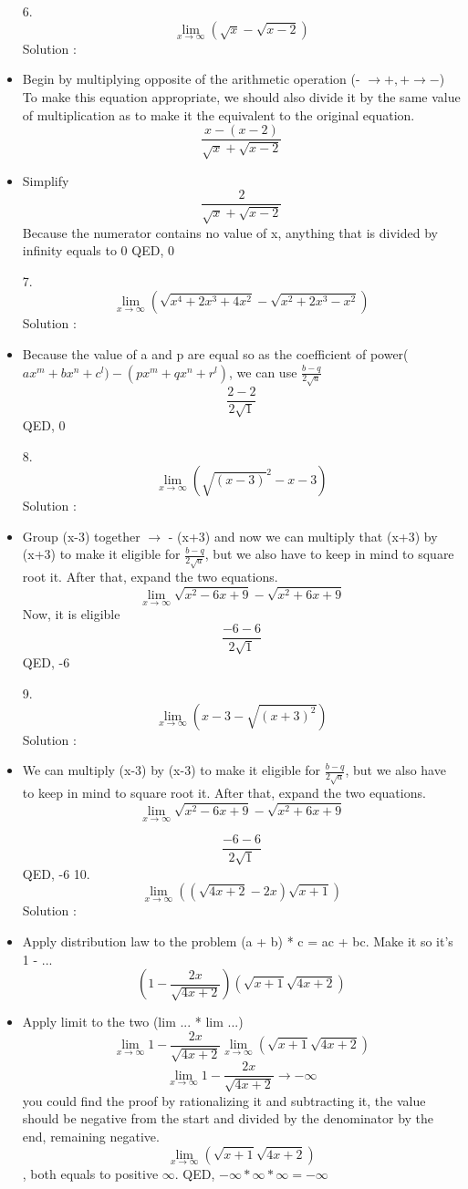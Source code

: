 \documentclass{article}
\begin{document}
\begin{itemize}
6. $$\displaystyle \lim_{x\to\infty}(\sqrt{x}-\sqrt{x-2})$$
Solution : 

\item Begin by multiplying opposite of the arithmetic operation (- $\to +, + \to -$) To make this equation appropriate, we should also divide it by the same value of multiplication as to make it the equivalent to the original equation.
$$\frac{x-(x-2)}{\sqrt{x}+\sqrt{x-2}}$$
\item Simplify 
$$\frac{2}{\sqrt{x}+\sqrt{x-2}}$$
Because the numerator contains no value of x, anything that is divided by infinity equals to 0
QED, 0

7. $$\displaystyle \lim_{x\to\infty}(\sqrt{x^4+2x^3+4x^2}-\sqrt{x^2+2x^3-x^2})$$
Solution : 

\item Because the value of a and p are equal so as the coefficient of power($ax^m+bx^n+c^l)-(px^m+qx^n+r^l)$, we can use $\frac{b-q}{2\sqrt{a}}$
$$\frac{2-2}{2\sqrt{1}}$$
QED, 0

8. $$\displaystyle \lim_{x\to\infty}\left(\sqrt{(x-3)}^2-x-3\right)$$
Solution :

\item Group (x-3) together $\to$ - (x+3) and now we can multiply that (x+3) by (x+3) to make it eligible for $\frac{b-q}{2\sqrt{a}}$, but we also have to keep in mind to square root it. After that, expand the two equations.
$$\displaystyle \lim_{x\to\infty} \sqrt{x^2-6x+9}-\sqrt{x^2+6x+9}$$
Now, it is eligible 
$$\frac{-6-6}{2\sqrt{1}}$$
QED, -6

9. $$\displaystyle \lim_{x\to\infty}\left(x-3-\sqrt{(x+3)^2}\right)$$
Solution : 

\item We can multiply (x-3) by (x-3) to make it eligible for $\frac{b-q}{2\sqrt{a}}$, but we also have to keep in mind to square root it. After that, expand the two equations.
$$\displaystyle \lim_{x\to\infty} \sqrt{x^2-6x+9}-\sqrt{x^2+6x+9}$$

$$\frac{-6-6}{2\sqrt{1}}$$
QED, -6
10. $$\displaystyle \lim_{x\to\infty}\left((\sqrt{4x+2}-2x)\sqrt{x+1}\right)$$
Solution : 

\item Apply distribution law to the problem (a + b) * c = ac + bc. Make it so it's 1 - ... 
$$(1-\frac{2x}{\sqrt{4x+2}})(\sqrt{x+1}\sqrt{4x+2})$$
\item Apply limit to the two (lim ... * lim ...)
$$\displaystyle \lim_{x\to\infty}1-\frac{2x}{\sqrt{4x+2}}\lim_{x\to\infty}(\sqrt{x+1}\sqrt{4x+2})$$
$$\displaystyle \lim_{x\to\infty}1-\frac{2x}{\sqrt{4x+2}} \to -\infty$$ you could find the proof by rationalizing it and subtracting it, the value should be negative from the start and divided by the denominator by the end, remaining negative. 
$$\lim_{x\to\infty}(\sqrt{x+1}\sqrt{4x+2})$$, both equals to positive $\infty$. 
QED, $-\infty * \infty * \infty = -\infty$


\end{itemize}
\end{document}

